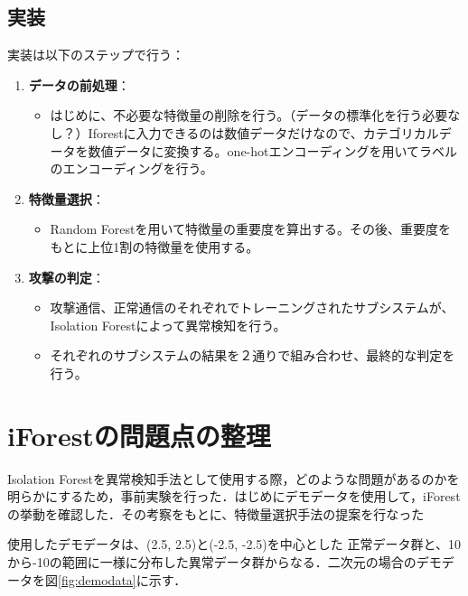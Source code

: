 \documentclass{css}
\begin{document}
\subsection{実装}
実装は以下のステップで行う：
\begin{enumerate}
    \item \textbf{データの前処理}：
        \begin{itemize}
            \item はじめに、不必要な特徴量の削除を行う。（データの標準化を行う必要なし？）Iforestに入力できるのは数値データだけなので、カテゴリカルデータを数値データに変換する。one-hotエンコーディングを用いてラベルのエンコーディングを行う。
        \end{itemize}
    \item \textbf{特徴量選択}：
        \begin{itemize}
            \item Random Forestを用いて特徴量の重要度を算出する。その後、重要度をもとに上位1割の特徴量を使用する。
        \end{itemize}
    \item \textbf{攻撃の判定}：
        \begin{itemize}
            \item 攻撃通信、正常通信のそれぞれでトレーニングされたサブシステムが、Isolation Forestによって異常検知を行う。
            \item それぞれのサブシステムの結果を２通りで組み合わせ、最終的な判定を行う。
        \end{itemize}
\end{enumerate}


\section{iForestの問題点の整理}
Isolation Forestを異常検知手法として使用する際，どのような問題があるのかを明らかにするため，事前実験を行った．はじめにデモデータを使用して，iForestの挙動を確認した．その考察をもとに、特徴量選択手法の提案を行なった

使用したデモデータは、(2.5, 2.5)と(-2.5, -2.5)を中心とした
正常データ群と、10から-10の範囲に一様に分布した異常データ群からなる．二次元の場合のデモデータを図\ref{fig:demodata}に示す．
\end{document}
